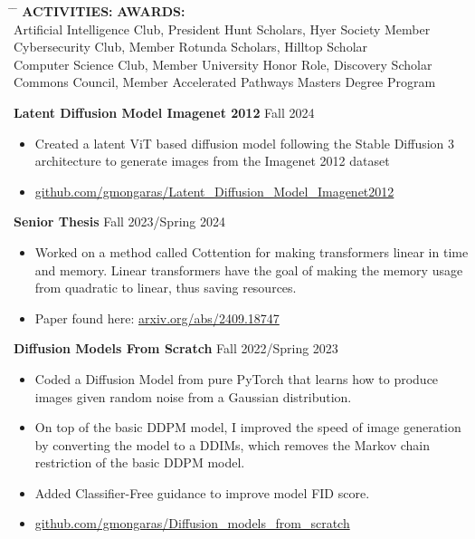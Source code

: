 \documentclass[a4paper,10pt]{article}
\begin{document}
\newpage

\begin{tabbing}
\hspace{4in} \= \hspace{2in} \= \kill
\textbf{ACTIVITIES:} \> \textbf{AWARDS:} \\
Artificial Intelligence Club, President \> Hunt Scholars, Hyer Society Member \\
Cybersecurity Club, Member \> Rotunda Scholars, Hilltop Scholar  \\
Computer Science Club, Member \> University Honor Role, Discovery Scholar \\
Commons Council, Member \> Accelerated Pathways Masters Degree Program \\
\end{tabbing}




\vspace{0pt}
 \vspace{1pt}

\noindent\textbf{Latent Diffusion Model Imagenet 2012} \hfill Fall 2024
\begin{itemize}[noitemsep,topsep=0pt]
  \item Created a latent ViT based diffusion model following the Stable Diffusion 3 architecture to generate images from the Imagenet 2012 dataset
  \item \href{https://github.com/gmongaras/Latent_Diffusion_Model_Imagenet2012}{github.com/gmongaras/Latent\_Diffusion\_Model\_Imagenet2012}
\end{itemize}

\noindent\textbf{Senior Thesis} \hfill Fall 2023/Spring 2024
\begin{itemize}[noitemsep,topsep=0pt]
  \item Worked on a method called Cottention for making transformers linear in time and memory. Linear transformers have the goal of making the memory usage from quadratic to linear, thus saving resources.
  \item Paper found here: \href{https://arxiv.org/abs/2409.18747}{arxiv.org/abs/2409.18747}
\end{itemize}

\noindent\textbf{Diffusion Models From Scratch} \hfill Fall 2022/Spring 2023
\begin{itemize}[noitemsep,topsep=0pt]
  \item Coded a Diffusion Model from pure PyTorch that learns how to produce images given random noise from a Gaussian distribution.
  \item On top of the basic DDPM model, I improved the speed of image generation by converting the model to a DDIMs, which removes the Markov chain restriction of the basic DDPM model.
  \item Added Classifier-Free guidance to improve model FID score.
  \item \href{https://github.com/gmongaras/Diffusion_models_from_scratch}{github.com/gmongaras/Diffusion\_models\_from\_scratch}
\end{itemize}
\end{document}
